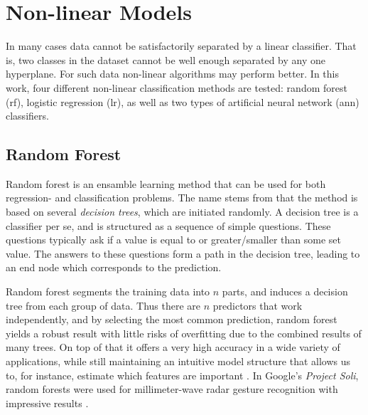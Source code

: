 \section{Non-linear Models}
In many cases data cannot be satisfactorily separated by a linear classifier. That is, two classes in the dataset cannot be well enough separated by any one hyperplane. For such data non-linear algorithms may perform better. In this work, four different non-linear classification methods are tested: random forest (\gls{rf}), logistic regression (\gls{lr}), as well as two types of artificial neural network (\gls{ann}) classifiers. 



\subsection{Random Forest}
Random forest is an ensamble learning method that can be used for both regression- and classification problems. The name stems from that the method is based on several \textit{decision trees}, which are initiated randomly. A decision tree is a classifier per se, and is structured as a sequence of simple questions. These questions typically ask if a value is equal to or greater/smaller than some set value. The answers to these questions form a path in the decision tree, leading to an end node which corresponds to the prediction.

Random forest segments the training data into $n$ parts, and induces a decision tree from each group of data. Thus there are $n$ predictors that work independently, and by selecting the most common prediction, random forest yields a robust result with little risks of overfitting due to the combined results of many trees. On top of that it offers a very high accuracy in a wide variety of applications, while still maintaining an intuitive model structure that allows us to, for instance, estimate which features are important \citep{breiman_2002}. In Google's \emph{Project Soli}, random forests were used for millimeter-wave radar gesture recognition with impressive results \citep{lien_gillian_karagozler_amihood_schwesig_olson_raja_poupyrev_2016}. 

